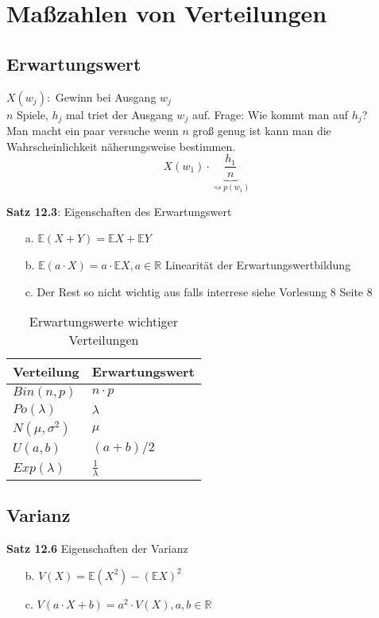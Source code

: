 \section{Maßzahlen von Verteilungen}

\subsection{Erwartungswert}
$X(w_j):$ Gewinn bei Ausgang $w_j$\\
$n$ Spiele, $h_j$ mal triet der Ausgang $w_j$ auf.
Frage: Wie kommt man auf $h_j$?\\
Man macht ein paar versuche wenn $n$ groß genug ist kann man die Wahrscheinlichkeit näherungsweise bestimmen.
\[X(w_1)\cdot \underbrace{\frac{h_1}{n}}_{\rightsquigarrow p(w_1)}\]

\textbf{Satz 12.3}: Eigenschaften des Erwartungswert
\begin{itemize}
    \item [a.] $\mathbb{E}(X+Y) = \mathbb{E}X +  \mathbb{E}Y$
    \item [b.] $\mathbb{E}(a\cdot X) = a\cdot \mathbb{E}X, a\in \mathbb{R} $ Linearität der Erwartungswertbildung
    \item [c.] Der Rest so nicht wichtig aus falls interrese siehe Vorlesung 8 Seite 8
\end{itemize}
    

\begin{table}[h]
    \begin{tabular}{|l|l|}
    \hline
    Verteilung     & Erwartungswert     \\ \hline
    $Bin(n,p)$     & $n\cdot p$         \\
    $Po(\lambda)$  & $\lambda$          \\ \hline
    $N(\mu,\sigma ^2)$   & $\mu$              \\
    $U(a,b)$       & $(a+b)/2$          \\
    $Exp(\lambda)$ & $\frac{1}{\lambda}$ \\ \hline
    \end{tabular}
    \caption{Erwartungswerte wichtiger Verteilungen}
    \label{Erwartungswerte wichtiger Verteilungen}
\end{table}




\subsection{Varianz}
\textbf{Satz 12.6} Eigenschaften der Varianz\\
\begin{itemize}
    \item [b.] $V(X) =\mathbb{E}(X^2)-(\mathbb{E}X)^2$
    \item [c.] $V(a\cdot X +b)= a^2\cdot V(X), a,b \in \mathbb{R} $
\end{itemize}

